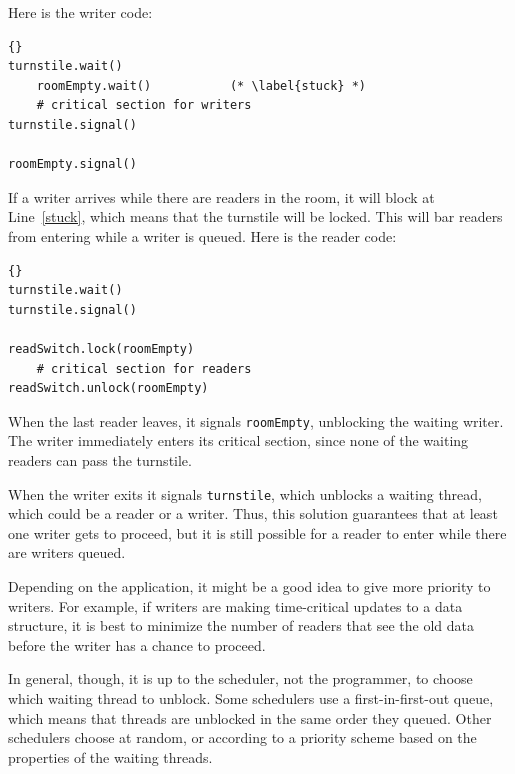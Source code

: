 \documentclass{book}
\begin{document}
Here is the writer code:

\begin{latin}
\begin{latin}
\begin{lstlisting}[title={No-starve writer solution}]{}
turnstile.wait()
    roomEmpty.wait()           (* \label{stuck} *)
    # critical section for writers
turnstile.signal()

roomEmpty.signal()
\end{lstlisting}
\end{latin}
\end{latin}

If a writer arrives while there are readers in the room, it
will block at Line~\ref{stuck}, which means that the turnstile will
be locked.  This will bar readers from entering while a writer
is queued.  Here is the reader code:

\begin{latin}
\begin{latin}
\begin{lstlisting}[title={No-starve reader solution}]{}
turnstile.wait()
turnstile.signal()

readSwitch.lock(roomEmpty)
    # critical section for readers
readSwitch.unlock(roomEmpty)
\end{lstlisting}
\end{latin}
\end{latin}

When the last reader leaves, it signals {\tt roomEmpty},
unblocking the waiting writer.  The writer immediately
enters its critical section, since none of the waiting
readers can pass the turnstile.

When the writer exits it signals {\tt turnstile}, which unblocks a
waiting thread, which could be a reader or a writer.  Thus, this
solution guarantees that at least one writer gets to proceed, but it
is still possible for a reader to enter while there are writers
queued.  

Depending on the application, it might be a good idea to
give more priority to writers.  For example, if writers are making
time-critical updates to a data structure, it is best
to minimize the number of readers that see the old data before
the writer has a chance to proceed.

In general, though, it is up to the scheduler, not the programmer,
to choose which waiting thread to unblock.
Some schedulers use a first-in-first-out queue, which means
that threads are unblocked in the same order they queued.
Other schedulers choose at random, or according to
a priority scheme based on the properties of the waiting
threads.
\end{document}
